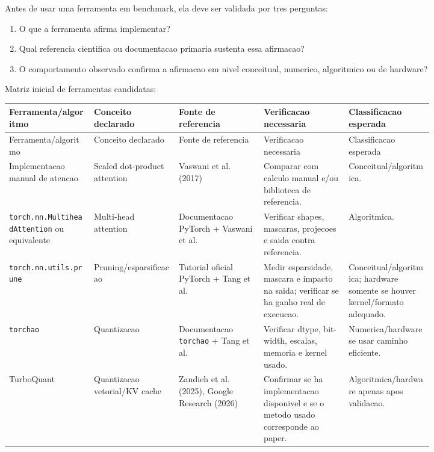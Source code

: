 Antes de usar uma ferramenta em benchmark, ela deve ser validada por tres perguntas:


\begin{enumerate}
\item O que a ferramenta afirma implementar?
\item Qual referencia cientifica ou documentacao primaria sustenta essa afirmacao?
\item O comportamento observado confirma a afirmacao em nivel conceitual,
numerico, algoritmico ou de hardware?
\end{enumerate}


Matriz inicial de ferramentas candidatas:



\begin{landscape}
\scriptsize
\begin{longtable}{@{}>{\RaggedRight\arraybackslash}p{0.164\linewidth}>{\RaggedRight\arraybackslash}p{0.164\linewidth}>{\RaggedRight\arraybackslash}p{0.164\linewidth}>{\RaggedRight\arraybackslash}p{0.164\linewidth}>{\RaggedRight\arraybackslash}p{0.164\linewidth}@{}}
\toprule
Ferramenta/algoritmo & Conceito declarado & Fonte de referencia & Verificacao necessaria & Classificacao esperada \\
\midrule
\endfirsthead
\toprule
Ferramenta/algoritmo & Conceito declarado & Fonte de referencia & Verificacao necessaria & Classificacao esperada \\
\midrule
\endhead
Implementacao manual de atencao & Scaled dot-product attention & Vaswani et al. (2017) & Comparar com calculo manual e/ou biblioteca de referencia. & Conceitual/algoritmica. \\
\texttt{torch.\allowbreak{}nn.\allowbreak{}MultiheadAttention} ou equivalente & Multi-head attention & Documentacao PyTorch + Vaswani et al. & Verificar shapes, mascaras, projecoes e saida contra referencia. & Algoritmica. \\
\texttt{torch.\allowbreak{}nn.\allowbreak{}utils.\allowbreak{}prune} & Pruning/esparsificacao & Tutorial oficial PyTorch + Tang et al. & Medir esparsidade, mascara e impacto na saida; verificar se ha ganho real de execucao. & Conceitual/algoritmica; hardware somente se houver kernel/formato adequado. \\
\texttt{torchao} & Quantizacao & Documentacao \texttt{torchao} + Tang et al. & Verificar dtype, bit-width, escalas, memoria e kernel usado. & Numerica/hardware se usar caminho eficiente. \\
TurboQuant & Quantizacao vetorial/KV cache & Zandieh et al. (2025), Google Research (2026) & Confirmar se ha implementacao disponivel e se o metodo usado corresponde ao paper. & Algoritmica/hardware apenas apos validacao. \\
\bottomrule
\end{longtable}
\end{landscape}



